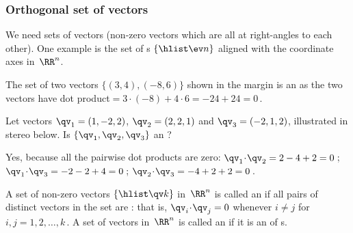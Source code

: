 \subsubsection{Orthogonal set of vectors}


We need sets of  vectors (non-zero vectors which are all at right-angles to each other).
One example is the set of s \(\{\hlist\ev n\}\) aligned with the coordinate axes in~\(\RR^n\).  

\begin{example} \label{eg:orthogduo}
The set of two vectors \(\{(3,4),(-8,6)\}\) shown in the margin
%
is an  as the two vectors have dot product\({}=3\cdot(-8)+4\cdot6=-24+24=0\)\,.
\end{example}


\begin{example} \label{eg:orthogtrio}
Let vectors \(\qv_1=(1,-2,2)\), \(\qv_2=(2,2,1)\) and \(\qv_3=(-2,1,2)\), illustrated in stereo below. 
Is \(\{\qv_1,\qv_2,\qv_3\}\) an ?
\begin{center}
\end{center}

\begin{solution} 
Yes, because all the pairwise dot products are zero: \(\qv_1\cdot\qv_2=2-4+2=0\)\,; \(\qv_1\cdot\qv_3=-2-2+4=0\)\,; \(\qv_2\cdot\qv_3=-4+2+2=0\)\,. 
\end{solution}
\end{example}

\begin{definition} \label{def:orthoset} 
A set of non-zero vectors \(\{\hlist\qv k\}\) in~\(\RR^n\) is called an  if all pairs of distinct vectors in the set are : that is, \(\qv_i\cdot\qv_j=0\) whenever \(i\neq j\) for \(i,j=1,2,\ldots,k\)\,.
A set of vectors in~\(\RR^n\) is called an  if it is an  of s.
\end{definition}

